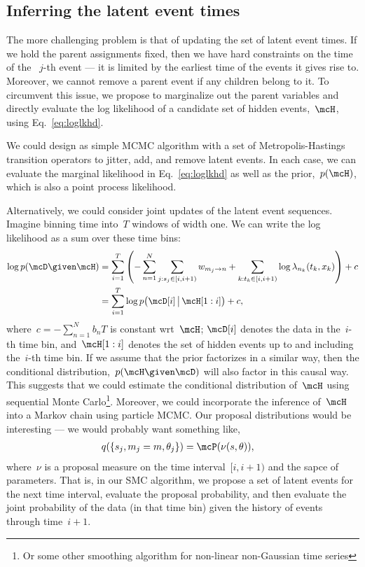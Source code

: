 \subsection{Inferring the latent event times}
The more challenging problem is that of updating the
set of latent event times. If we hold the parent assignments
fixed, then we have hard constraints on the time of the
~$j$-th event --- it is limited by the earliest time of
the events it gives rise to. Moreover, we cannot remove
a parent event if any children belong to it. To circumvent
this issue, we propose to marginalize out the parent
variables and directly evaluate the log likelihood of a
candidate set of hidden events,~$\mcH$, using Eq.~\eqref{eq:loglkhd}.

We could design as simple MCMC algorithm with a set of
Metropolis-Hastings transition operators to jitter, add,
and remove latent events. In each case, we can evaluate
the marginal likelihood in Eq.~\eqref{eq:loglkhd} as
well as the prior,~$p(\mcH)$, which is also a point
process likelihood.

Alternatively, we could consider joint updates of the
latent event sequences. Imagine binning time into~$T$
windows of width one.  We can write the log likelihood
as a sum over these time bins:
\begin{align}
\log p(\mcD \given \mcH) &=
\sum_{i=1}^T \left(
  -\sum_{n=1}^N \sum_{j: s_j \in [i, i+1)} w_{m_j \to n} 
  + \sum_{k: t_k \in [i, i+1)} \log \lambda_{n_k}(t_k, x_k) 
\right) + c \\
&= \sum_{i=1}^T \log p\big(\mcD[i] \, \big| \, \mcH[1:i]\big) + c,
\end{align}
where~$c=-\sum_{n=1}^N b_nT$ is constant wrt~$\mcH$; $\mcD[i]$
denotes the data in the~$i$-th time bin, and~$\mcH[1:i]$ denotes
the set of hidden events up to and including the~$i$-th time bin.
If we assume that the prior factorizes in a similar way, then the
conditional distribution,~$p(\mcH \given \mcD)$ will also factor
in this causal way. This suggests that we could estimate the
conditional distribution of~$\mcH$ using sequential Monte
Carlo\footnote{Or some other smoothing algorithm for non-linear non-Gaussian
time series}. Moreover, we could incorporate the inference of~$\mcH$
into a Markov chain using particle MCMC. Our proposal distributions
would be interesting --- we would probably want something like,
\begin{align}
  q(\{s_j, m_j=m, \theta_j\}) &= \mcP(\nu(s, \theta)),
\end{align} 
where~$\nu$ is a proposal measure on the time interval~$[i, i+1)$ and
the sapce of parameters. That is, in our SMC algorithm, we propose
a set of latent events for the next time interval, evaluate the
proposal probability, and then evaluate the joint probability of
the data (in that time bin) given the history of events through time~$i+1$. 







